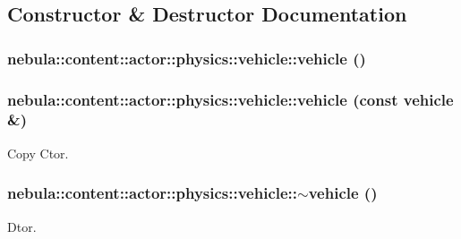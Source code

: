 \subsection{Constructor \& Destructor Documentation}
\hypertarget{classnebula_1_1content_1_1actor_1_1physics_1_1vehicle_aaceeb5f53c1dcb1199e1564e2132748b}{
\subsubsection[{vehicle}]{\setlength{\rightskip}{0pt plus 5cm}nebula::content::actor::physics::vehicle::vehicle ()}}
\label{classnebula_1_1content_1_1actor_1_1physics_1_1vehicle_aaceeb5f53c1dcb1199e1564e2132748b}
\hypertarget{classnebula_1_1content_1_1actor_1_1physics_1_1vehicle_a756405424b4357fa43c473213b7afe04}{
\subsubsection[{vehicle}]{\setlength{\rightskip}{0pt plus 5cm}nebula::content::actor::physics::vehicle::vehicle (const {\bf vehicle} \&)}}
\label{classnebula_1_1content_1_1actor_1_1physics_1_1vehicle_a756405424b4357fa43c473213b7afe04}


Copy Ctor. \hypertarget{classnebula_1_1content_1_1actor_1_1physics_1_1vehicle_aaea3f60e22369bf24ebc74746397bf0b}{
\subsubsection[{$\sim$vehicle}]{\setlength{\rightskip}{0pt plus 5cm}nebula::content::actor::physics::vehicle::$\sim$vehicle ()}}
\label{classnebula_1_1content_1_1actor_1_1physics_1_1vehicle_aaea3f60e22369bf24ebc74746397bf0b}


Dtor. 

